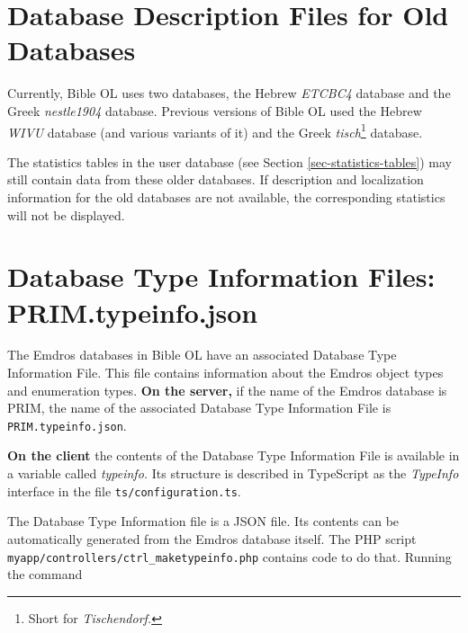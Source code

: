 \documentclass[11pt,oneside,a4paper]{memoir}
\begin{document}
\section{Database Description Files for Old Databases}\label{sec-old-db}

Currently, Bible OL uses two databases, the Hebrew \emph{ETCBC4} database and the Greek
\emph{nestle1904} database. Previous versions of Bible OL used the Hebrew \emph{WIVU}
database (and various variants of it) and the Greek \emph{tisch}\footnote{Short for
  \emph{Tischendorf.}} database.

The statistics tables in the user database (see Section
\ref{sec-statistics-tables}) may still contain data from these older databases. If description and
localization information for the old databases are not available, the corresponding statistics will
not be displayed.





\section{Database Type Information Files: PRIM.typeinfo.json}\label{sec-tif}

The Emdros databases in Bible OL have an associated Database Type Information File. This file
contains information about the Emdros object types and
enumeration types. \textbf{On the server,} if the name of the Emdros
database is PRIM, the name of the associated Database Type Information File is
\texttt{PRIM.typeinfo.json}.

\textbf{On the client} the contents of the Database Type Information File is available in a variable
called \emph{typeinfo.}%
Its structure is described in TypeScript as the \emph{TypeInfo} interface%
in the file \texttt{ts/configuration.ts}.

The Database Type Information file is a JSON file. Its contents can be automatically generated from
the Emdros database itself. The PHP script \texttt{myapp/controllers/ctrl\_maketypeinfo.php}
contains code to do that. Running the command
\end{document}
